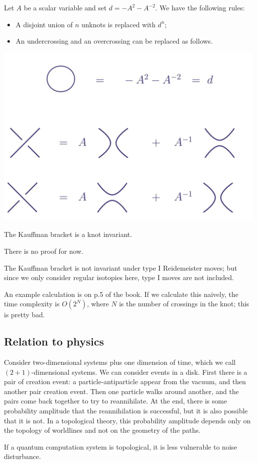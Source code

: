 \begin{example}
  Let $A$ be a scalar variable and set $d = -A^2 -A^{-2}$. We have the following rules:
  \begin{itemize}
    \item A disjoint union of $n$ unknots is replaced with $d^n$;
    \item An undercrossing and an overcrossing can be replaced as follows.
  \end{itemize}
  \begin{center}
	\includegraphics[width=.5\linewidth]{img/1-14-27-14.png}
\end{center}
\end{example}


\begin{proposition}
  The Kauffman bracket is a knot invariant.
\end{proposition}

There is no proof for now.


\begin{remark}
    The Kauffman bracket is not invariant under type I Reidemeister moves; but since we only consider regular isotopies here, type I moves are not included.
\end{remark}

An example calculation is on p.5 of the book.
If we calculate this naively, the time complexity is $O(2^N)$, where $N$ is the number of crossings in the knot; this is pretty bad.


\subsection{Relation to physics}

Consider two-dimensional systems plus one dimension of time, which we call $(2+1)$-dimensional systems. We can consider events in a disk. First there is a pair of creation event: a particle-antiparticle appear from the vacuum, and then another pair creation event. Then one particle walks around another, and the pairs come back together to try to reannihilate. At the end, there is some probability amplitude that the reannihilation is successful, but it is also possible that it is not. In a topological theory, this probability amplitude depends only on the topology of worldlines and not on the geometry of the paths. 

If a quantum computation system is topological, it is less vulnerable to noise disturbance.
